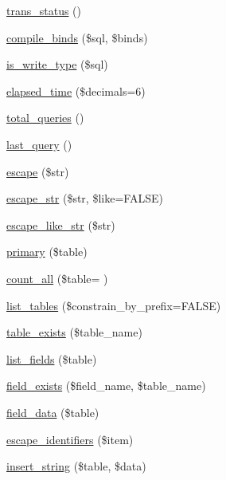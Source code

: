 \begin{DoxyCompactItemize}
\hyperlink{class_c_i___d_b__driver_a7ce49452153f13afde8f9c5212028be6}{trans\+\_\+status} ()
\item 
\hyperlink{class_c_i___d_b__driver_a0ba381d2e9078472bd0167e75cc8033c}{compile\+\_\+binds} (\$sql, \$binds)
\item 
\hyperlink{class_c_i___d_b__driver_af435df5703c238769d6d16fde6d51182}{is\+\_\+write\+\_\+type} (\$sql)
\item 
\hyperlink{class_c_i___d_b__driver_a7bcec8d3f7d72453deb78e296815711a}{elapsed\+\_\+time} (\$decimals=6)
\item 
\hyperlink{class_c_i___d_b__driver_a8fc0b6551e1ca0c68c6e3a66b27310fc}{total\+\_\+queries} ()
\item 
\hyperlink{class_c_i___d_b__driver_a8117354f1fa0b2873f0ad2792dc21389}{last\+\_\+query} ()
\item 
\hyperlink{class_c_i___d_b__driver_ac8f37ca5703d4558c732e692194f8cd6}{escape} (\$str)
\item 
\hyperlink{class_c_i___d_b__driver_aaba16891c8c93600a87075800cc5b72b}{escape\+\_\+str} (\$str, \$like=F\+A\+L\+S\+E)
\item 
\hyperlink{class_c_i___d_b__driver_a1a15f371afab8d5cfb35e38fc53c620f}{escape\+\_\+like\+\_\+str} (\$str)
\item 
\hyperlink{class_c_i___d_b__driver_a68e5f4a4a6fdb79a9a403b045c59b618}{primary} (\$table)
\item 
\hyperlink{class_c_i___d_b__driver_a66111c61856499b091af32502978d4fc}{count\+\_\+all} (\$table= \textquotesingle{}\textquotesingle{})
\item 
\hyperlink{class_c_i___d_b__driver_accef90659bed312aba1c3df80620b402}{list\+\_\+tables} (\$constrain\+\_\+by\+\_\+prefix=F\+A\+L\+S\+E)
\item 
\hyperlink{class_c_i___d_b__driver_af148cb2cd5d490d2a480c0c741ceed03}{table\+\_\+exists} (\$table\+\_\+name)
\item 
\hyperlink{class_c_i___d_b__driver_aef08cd376b16b24608100ca0e3f2f85b}{list\+\_\+fields} (\$table)
\item 
\hyperlink{class_c_i___d_b__driver_ad349ffee1eed59a2eb8f0f1d3033764f}{field\+\_\+exists} (\$field\+\_\+name, \$table\+\_\+name)
\item 
\hyperlink{class_c_i___d_b__driver_a90355121e1ed009e0efdbd544ab56efa}{field\+\_\+data} (\$table)
\item 
\hyperlink{class_c_i___d_b__driver_abe5c555644f8bac97c3f84c7d2325fdc}{escape\+\_\+identifiers} (\$item)
\item 
\hyperlink{class_c_i___d_b__driver_ad27720d886add2c9abf9ac48a9ff56d5}{insert\+\_\+string} (\$table, \$data)

\end{DoxyCompactItemize}
